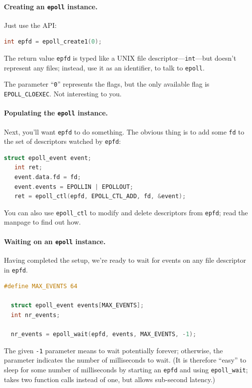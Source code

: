 \paragraph{Creating an {\tt epoll} instance.} Just use the API:
    \begin{lstlisting}[language=C]
   int epfd = epoll_create1(0);
    \end{lstlisting}

The return value {\tt epfd} is typed like a UNIX file
descriptor---{\tt int}---but doesn't represent any files; instead, use
it as an identifier, to talk to {\tt epoll}.

The parameter ``{\tt 0}'' represents the flags, but the only available flag
is {\tt EPOLL\_CLOEXEC}. Not interesting to you.

\paragraph{Populating the {\tt epoll} instance.} Next, you'll want
{\tt epfd} to do something. The obvious thing is to add some {\tt fd}
to the set of descriptors watched by {\tt epfd}:
    \begin{lstlisting}[language=C]
   struct epoll_event event;
   int ret;
   event.data.fd = fd;
   event.events = EPOLLIN | EPOLLOUT;
   ret = epoll_ctl(epfd, EPOLL_CTL_ADD, fd, &event);
    \end{lstlisting}

You can also use {\tt epoll\_ctl} to modify and delete descriptors from {\tt epfd}; read the manpage to find out how.

\paragraph{Waiting on an {\tt epoll} instance.} Having completed
the setup, we're ready to wait for events on any file descriptor in {\tt epfd}.
    \begin{lstlisting}[language=C]
  #define MAX_EVENTS 64

  struct epoll_event events[MAX_EVENTS];
  int nr_events;

  nr_events = epoll_wait(epfd, events, MAX_EVENTS, -1);
    \end{lstlisting}

The given {\tt -1} parameter means to wait potentially forever;
otherwise, the parameter indicates the number of milliseconds to wait.
(It is therefore ``easy'' to sleep for some number of milliseconds by
starting an {\tt epfd} and using {\tt epoll\_wait}; takes two function
calls instead of one, but allows sub-second latency.)

